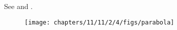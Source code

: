See 
and 
.
\begin{figure}[H]
	\begin{center} 
	    \texttt{[image: chapters/11/11/2/4/figs/parabola]}
	\end{center}
\caption{}
\label{fig:chapters/11/11/2/4/Fig1}
\end{figure}
